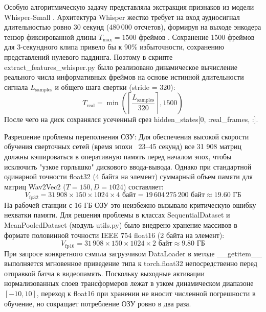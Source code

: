 \documentclass[a4paper,14pt]{extarticle}
\begin{document}
	Особую алгоритмическую задачу представляла экстракция признаков из модели Whisper-Small \cite{whisper}. Архитектура Whisper жестко требует на вход аудиосигнал длительностью ровно 30 секунд ($480\,000$ отсчетов), формируя на выходе энкодера тензор фиксированной длины $T_{\text{max}} = 1500$ фреймов \cite{whisper}. Сохранение 1500 фреймов для 3-секундного клипа привело бы к 90\% избыточности, сохранению представлений нулевого паддинга. Поэтому в скрипте extract\_\allowbreak features\_\allowbreak whisper.py было реализовано динамическое вычисление реального числа информативных фреймов на основе истинной длительности сигнала $L_{\text{samples}}$ и общего шага свертки (stride = 320):
	\begin{equation}
		T_{\text{real}} = \min \left( \left\lceil \frac{L_{\text{samples}}}{320} \right\rceil, 1500 \right)
	\end{equation}
	После чего на диск сохранялся усеченный срез hidden\_states[0, :real\_frames, :].
	
	Разрешение проблемы переполнения ОЗУ: Для обеспечения высокой скорости обучения сверточных сетей (время эпохи ~23–45 секунд) все 31 908 матриц должны кэшироваться в оперативную память перед началом эпох, чтобы исключить "узкое горлышко" дискового ввода-вывода. Однако при стандартной одинарной точности float32 (4 байта на элемент) суммарный объем памяти для матриц Wav2Vec2 ($T = 150, D = 1024$) составляет:
	\begin{equation}
		V_{\text{fp32}} = 31\,908 \times 150 \times 1024 \times 4\text{ байт} = 19\,604\,275\,200\text{ байт} \approx 19.60\text{ ГБ}
	\end{equation}
	На рабочей станции с 16 ГБ ОЗУ это неизбежно вызывало критическую ошибку нехватки памяти. Для решения проблемы в классах SequentialDataset и MeanPooledDataset (модуль utils.py) было внедрено хранение массивов в формате половинной точности IEEE 754 float16 (2 байта на элемент):
	\begin{equation}
		V_{\text{fp16}} = 31\,908 \times 150 \times 1024 \times 2\text{ байт} \approx 9.80\text{ ГБ}
	\end{equation}
	При запросе конкретного сэмпла загрузчиком DataLoader в методе \_\_getitem\_\_ выполняется мгновенное приведение типа к torch.float32 непосредственно перед отправкой батча в видеопамять. Поскольку выходные активации нормализованных слоев трансформеров лежат в узком динамическом диапазоне $[-10, 10]$, переход к float16 при хранении не вносит численной погрешности в обучение, но сокращает потребление ОЗУ ровно в два раза.
	
\end{document}
